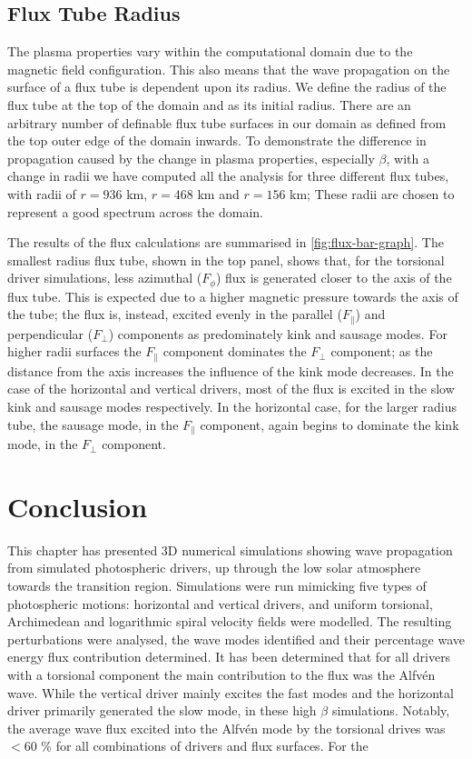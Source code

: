 \subsection{Flux Tube Radius}
The plasma properties vary within the computational domain due to the magnetic field configuration.
This also means that the wave propagation on the surface of a flux tube is dependent upon its radius. 
We define the radius of the flux tube at the top of the domain and as its initial radius.
There are an arbitrary number of definable flux tube surfaces in our domain as defined from the top outer edge of the domain inwards. 
To demonstrate the difference in propagation caused by the change in plasma properties, especially $\beta$, with a change in radii we have computed all the analysis for three different flux tubes, with radii of $r=936$ km, $r=468$ km and  $r=156$ km; These radii are chosen to represent a good spectrum across the domain.

The results of the flux calculations are summarised in \cref{fig:flux-bar-graph}.
The smallest radius flux tube, shown in the top panel, shows that, for the torsional driver simulations, less azimuthal ($F_\phi$) flux is generated closer to the axis of the flux tube. 
This is expected due to a higher magnetic pressure towards the axis of the tube; the flux is, instead, excited evenly in the parallel ($F_\parallel$) and perpendicular ($F_\perp$) components as predominately kink and sausage modes. 
For higher radii surfaces the $F_\parallel$ component dominates the $F_\perp$ component; as the distance from the axis increases the influence of the kink mode decreases.
In the case of the horizontal and vertical drivers, most of the flux is excited in the slow kink and sausage modes respectively.
In the horizontal case, for the larger radius tube, the sausage mode, in the $F_\parallel$ component, again begins to dominate the kink mode, in the $F_\perp$ component.

\section{Conclusion}
This chapter has presented 3D numerical simulations showing wave propagation from simulated photospheric drivers, up through the low solar atmosphere towards the transition region.
Simulations were run mimicking five types of photospheric motions: horizontal and vertical drivers, and uniform torsional, Archimedean and logarithmic spiral velocity fields were modelled.
The resulting perturbations were analysed, the wave modes identified and their percentage wave energy flux contribution determined. 
It has been determined that for all drivers with a torsional component the main contribution to the flux was the Alfv\'en wave.
While the vertical driver mainly excites the fast modes and the horizontal driver primarily generated the slow mode, in these high $\beta$ simulations.
Notably, the average wave flux excited into the Alfv\'en mode by the torsional drives was $<60$ \% for all combinations of drivers and flux surfaces.
For the 

